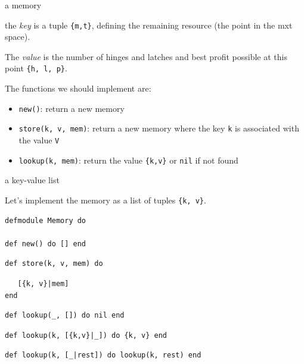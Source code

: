 \begin{frame}[fragile]{a memory}

\vspace{10pt}\pause

the {\em key} is a tuple \texttt{\{m,t\}}, defining the remaining resource (the point in the mxt space).

\vspace{10pt}\pause

The {\em value} is the number of hinges and latches and best profit possible at this point \texttt{\{h, l, p\}}.

\vspace{10pt}\pause

The functions we should implement are:

\begin{itemize}
\pause \item \texttt{new()}: return a new memory
\pause \item \texttt{store(k, v, mem)}: return a new memory where the key \texttt{k} is associated with the value \texttt{V}
\pause \item \texttt{lookup(k, mem)}: return the value \texttt{\{k,v\}} or \texttt{nil} if not found
\end{itemize}

\end{frame}


\begin{frame}[fragile]{a key-value list}

Let's implement the memory as a list of tuples \texttt{\{k, v\}}.

\pause \vspace{10pt}
\begin{verbatim}
defmodule Memory do

def new() do [] end
\end{verbatim}

\pause\vspace{5pt}
\begin{verbatim}
def store(k, v, mem) do
\end{verbatim}
\pause
\begin{verbatim}
   [{k, v}|mem]
end
\end{verbatim}

\pause\vspace{5pt}
\begin{verbatim}
def lookup(_, []) do nil end
\end{verbatim}\pause
\begin{verbatim}
def lookup(k, [{k,v}|_]) do {k, v} end
\end{verbatim}
\pause
\begin{verbatim}
def lookup(k, [_|rest]) do lookup(k, rest) end
\end{verbatim}

\end{frame}

